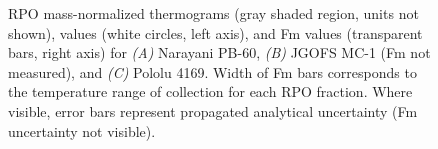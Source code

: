 \begin{figure}[p]
	\caption[RPO thermograms, , and Fm values for all samples]{RPO mass-normalized thermograms (gray shaded region, units not shown),  values (white circles, left axis), and Fm values (transparent bars, right axis) for \textit{(A)} Narayani PB-60, \textit{(B)} JGOFS MC-1 (Fm not measured), and \textit{(C)} Pololu 4169. Width of Fm bars corresponds to the temperature range of collection for each RPO fraction. Where visible,  error bars represent propagated analytical uncertainty (Fm uncertainty not visible).}
	\label{Ch3Fig:2} 
\end{figure}


